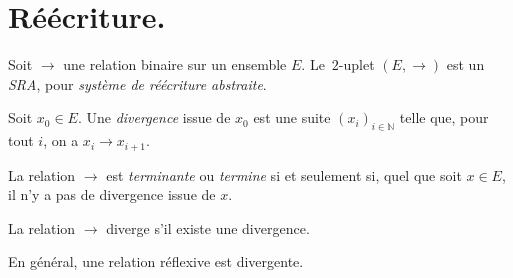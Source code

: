 \documentclass[../main]{subfiles}
\begin{document}
  \chapter{Réécriture.} \label{thprog-chap10}
  \minitoc

  \begin{defn}
    Soit $\to$ une relation binaire sur un ensemble $E$. Le~$2$-uplet $(E, \to)$ est un \textit{SRA}, pour \textit{système de réécriture abstraite}.

    Soit $x_0 \in E$. Une \textit{divergence} issue de $x_0$ est une suite $(x_i)_{i \in \mathds{N}}$ telle que, pour tout $i$, on a $x_i \to x_{i+1}$.

    La relation $\to$ est \textit{terminante} ou \textit{termine} si et seulement si, quel que soit $x \in E$, il n'y a pas de divergence issue de $x$.

    La relation $\to$ diverge s'il existe une divergence.
  \end{defn}

  \begin{exm}
    En général, une relation réflexive est divergente.
  \end{exm}
\end{document}
